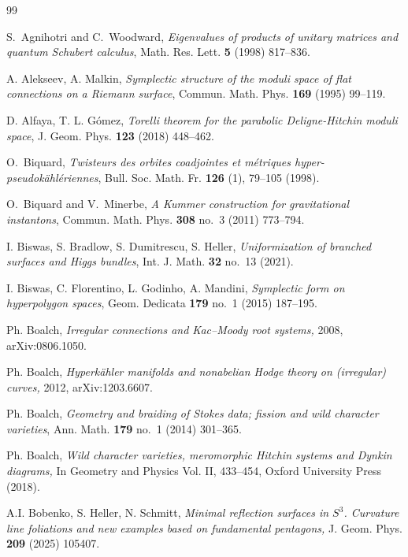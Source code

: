 \documentclass[12pt,a4paper]{amsart}
\theoremstyle{definition}
\theoremstyle{remark}
\begin{document}

\begin{thebibliography}{99}

S.~Agnihotri and C.~Woodward, {\em Eigenvalues of products of unitary matrices and quantum
Schubert calculus}, Math. Res. Lett. \textbf{5} (1998) 817--836.

A. Alekseev, A. Malkin, {\em Symplectic structure of the moduli space of flat connections on a Riemann
surface}, Commun. Math. Phys. \textbf{169} (1995) 99--119.

 {\sc D. Alfaya, T. L. G\'omez}, {\em Torelli theorem for the parabolic Deligne-Hitchin moduli space}, J. Geom. Phys. \textbf{123} (2018) 448--462.

O.~Biquard, \emph{Twisteurs des orbites coadjointes et m\'etriques hyper-pseudok\"ahl\'eriennes},
 Bull. Soc. Math. Fr. \textbf{126} (1), 79--105 (1998).

O.~Biquard and V.~Minerbe,
\emph{A Kummer construction for gravitational instantons},
Commun. Math. Phys. \textbf{308} no.~3 (2011) 773--794.

 I. Biswas, S. Bradlow, S. Dumitrescu, S. Heller, {\em Uniformization of branched
surfaces and Higgs bundles}, Int. J. Math. \textbf{32} no.~13 (2021).

 I. Biswas, C. Florentino,  L. Godinho, A. Mandini, {\em Symplectic form on hyperpolygon spaces}, Geom. Dedicata \textbf{179} no.~1 (2015) 187--195.

 Ph. Boalch, {\em Irregular connections and Kac--Moody root systems,} 2008, arXiv:0806.1050.

 Ph. Boalch, {\em  Hyperk\"ahler manifolds and nonabelian Hodge theory on (irregular) curves,} 2012,
arXiv:1203.6607.

 Ph. Boalch, {\em Geometry and braiding of Stokes data; fission and wild character varieties}, 
Ann. Math. \textbf{179} no.~1 (2014) 301--365.

 Ph. Boalch, {\em Wild character varieties, meromorphic Hitchin systems and Dynkin diagrams,}
In Geometry and Physics Vol. II, 433--454, Oxford University Press (2018).

 A.I. Bobenko, S. Heller, N. Schmitt,
{\em Minimal reflection surfaces in $S^3$.
Curvature line foliations and
new examples based on fundamental pentagons,}
J. Geom.  Phys. \textbf{209} (2025) 105407.


\end{thebibliography}
\end{document}
